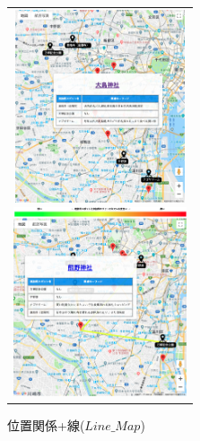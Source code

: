 \documentclass{deimj}
\begin{document}
\begin{figure}[t]
  \begin{center}
    \begin{tabular}{c}

      \begin{minipage}{0.33\hsize}
        \begin{center}
          \includegraphics[clip, width=5cm]{picture/position_map2.png}
          \hspace{0.1cm}
          \caption{位置関係($Position\_Map$)}
          \label{fig:P}
        \end{center}
      \end{minipage}

      \begin{minipage}{0.33\hsize}
        \begin{center}
          \includegraphics[clip, width=5.1cm]{picture/line_map2.png}
          \hspace{0.1cm}
          \caption{位置関係+線($Line\_Map$)}
          \label{fig:L}
        \end{center}
      \end{minipage}


\end{tabular}
\end{center}
\end{figure}
\end{document}
